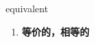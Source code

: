 
\begin{frame}
{\huge equivalent}
\begin{center}
\begin{enumerate}\Large
  \item \textbf{等价的，相等的}
\end{enumerate}
\end{center}
\end{frame}

